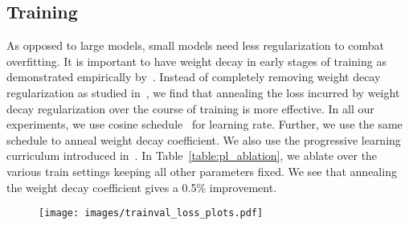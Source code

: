 \subsection{Training}\label{sec:progressive_training}
As opposed to large models, small models need less regularization to combat overfitting. It is important to have weight decay in early stages of training as demonstrated empirically by~\cite{time_matters_weightdecay}. Instead of completely removing weight decay regularization as studied in~\cite{time_matters_weightdecay}, we find that annealing the loss incurred by weight decay regularization over the course of training is more effective. In all our experiments, we use cosine schedule~\cite{cosinelr_iclr2017} for learning rate. Further, we use the same schedule to anneal weight decay coefficient. We also use the progressive learning curriculum introduced in~\cite{efficientnet_v2_quoc}. 
In Table~\ref{table:pl_ablation}, we ablate over the various train settings keeping all other parameters fixed. We see that annealing the weight decay coefficient gives a 0.5\% improvement.
\begin{table}
  \footnotesize
  \centering
  \caption{Ablation on various train settings for MobileOne-S2 showing Top-1 accuracy on ImageNet.} \label{table:pl_ablation}
  \vspace{-0.2cm}
\end{table}

\begin{figure}
    \centering
    \texttt{[image: images/trainval\_loss\_plots.pdf]}
    \label{fig:trainval_loss}
\end{figure}


